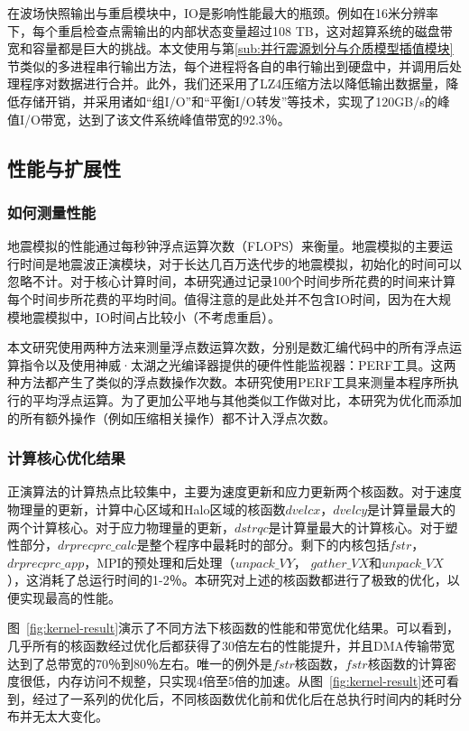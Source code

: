 在波场快照输出与重启模块中，IO是影响性能最大的瓶颈。例如在16米分辨率下，每个重启检查点需输出的内部状态变量超过108 TB，这对超算系统的磁盘带宽和容量都是巨大的挑战。本文使用与第\ref{sub:并行震源划分与介质模型插值模块}节类似的多进程串行输出方法，每个进程将各自的串行输出到硬盘中，并调用后处理程序对数据进行合并。此外，我们还采用了LZ4压缩方法以降低输出数据量，降低存储开销，并采用诸如“组I/O”和“平衡I/O转发”等技术，实现了120GB/s的峰值I/O带宽，达到了该文件系统峰值带宽的92.3％。

\subsection{性能与扩展性}

\subsubsection{如何测量性能}

地震模拟的性能通过每秒钟浮点运算次数（FLOPS）来衡量。地震模拟的主要运行时间是地震波正演模块，对于长达几百万迭代步的地震模拟，初始化的时间可以忽略不计。对于核心计算时间，本研究通过记录100个时间步所花费的时间来计算每个时间步所花费的平均时间。值得注意的是此处并不包含IO时间，因为在大规模地震模拟中，IO时间占比较小（不考虑重启）。

本文研究使用两种方法来测量浮点数运算次数，分别是数汇编代码中的所有浮点运算指令以及使用神威·太湖之光编译器提供的硬件性能监视器：PERF工具。这两种方法都产生了类似的浮点数操作次数。本研究使用PERF工具来测量本程序所执行的平均浮点运算。为了更加公平地与其他类似工作做对比，本研究为优化而添加的所有额外操作（例如压缩相关操作）都不计入浮点次数。

\subsubsection{计算核心优化结果}

正演算法的计算热点比较集中，主要为速度更新和应力更新两个核函数。对于速度物理量的更新，计算中心区域和Halo区域的核函数$ dvelcx，dvelcy $是计算量最大的两个计算核心。对于应力物理量的更新，$ dstrqc $是计算量最大的计算核心。对于塑性部分，$ drprecprc\_calc $是整个程序中最耗时的部分。剩下的内核包括$ fstr $，$ drprecprc\_app $，MPI的预处理和后处理（$ unpack\_VY $，
$ gather\_VX $和$ unpack\_VX $），这消耗了总运行时间的1-2％。本研究对上述的核函数都进行了极致的优化，以便实现最高的性能。

图~\ref{fig:kernel-result}演示了不同方法下核函数的性能和带宽优化结果。可以看到，几乎所有的核函数经过优化后都获得了30倍左右的性能提升，并且DMA传输带宽达到了总带宽的70％到80％左右。唯一的例外是$ fstr $核函数，$fstr$核函数的计算密度很低，内存访问不规整，只实现4倍至5倍的加速。从图~\ref{fig:kernel-result}还可看到，经过了一系列的优化后，不同核函数优化前和优化后在总执行时间内的耗时分布并无太大变化。


